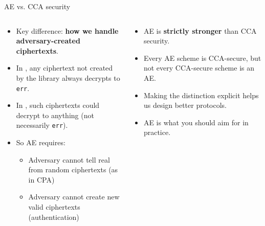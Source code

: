 \documentclass[aspectratio=169, lualatex, handout]{beamer}
\begin{document}
\begin{frame}{AE vs. CCA security}
	\begin{columns}[c]
		\begin{column}{0.5\textwidth}
			\begin{itemize}
				\item Key difference: \textbf{how we handle adversary-created ciphertexts}.
				\item In , any ciphertext not created by the library always decrypts to \texttt{err}.
				\item In , such ciphertexts could decrypt to anything (not necessarily \texttt{err}).
				\item So AE requires:
				      \begin{itemize}
					      \item Adversary cannot tell real from random ciphertexts (as in CPA)
					      \item Adversary cannot create new valid ciphertexts (authentication)
				      \end{itemize}
			\end{itemize}
		\end{column}
		\begin{column}{0.5\textwidth}
			\begin{itemize}
				\item AE is \textbf{strictly stronger} than CCA security.
				\item Every AE scheme is CCA-secure, but not every CCA-secure scheme is an AE.
				\item Making the distinction explicit helps us design better protocols.
				\item AE is what you should aim for in practice.
			\end{itemize}
		\end{column}
	\end{columns}
\end{frame}
\end{document}
